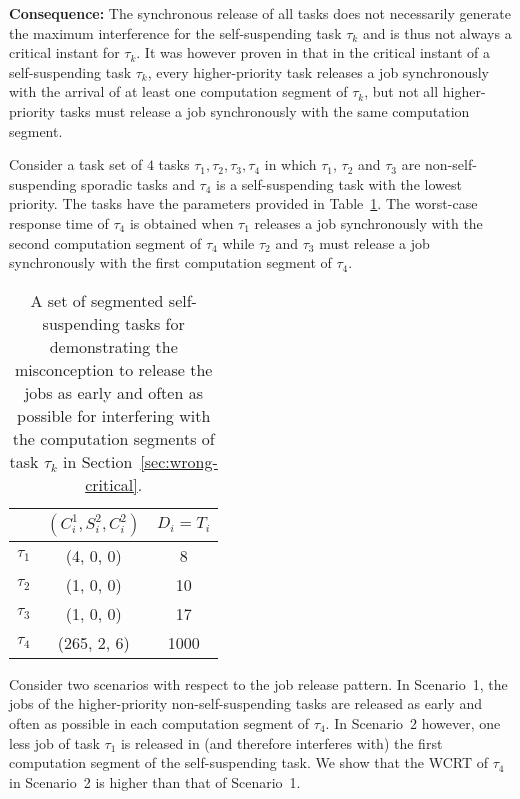 {\bf Consequence:}  The synchronous release of all tasks does not necessarily generate the maximum interference for the self-suspending task $\tau_k$ and is thus not always a critical instant for $\tau_k$. 
It was however proven in \cite{ecrts15nelissen} that in the critical instant of a self-suspending task $\tau_k$, every higher-priority task releases a job synchronously with the arrival of at least one computation segment of $\tau_k$, but not all higher-priority tasks must release a job synchronously with the same computation segment.


Consider a task set of $4$ tasks $\tau_1, \tau_2, \tau_3, \tau_4$ in which $\tau_1$, $\tau_2$ and $\tau_3$ are non-self-suspending sporadic tasks and $\tau_4$ is a self-suspending task with the lowest priority. The tasks have the parameters provided in Table~\ref{table:ex-num-releases}. The worst-case response time of $\tau_4$ is obtained when $\tau_1$ releases a job synchronously with the second computation segment of $\tau_4$ while $\tau_2$ and $\tau_3$ must release a job synchronously with the first computation segment of $\tau_4$.

\begin{table}[t]
\centering
    \begin{tabular}{|c|c|c|}
 \hline
        & $(C_i^1, S_i^2, C_i^2)$ &  $D_i=T_i$\\ 
        \hline
        $\tau_1$ & (4, 0, 0) &  8\\ 
        $\tau_2$ &  (1, 0, 0) & 10 \\ 
        $\tau_3$ & (1, 0, 0) & 17 \\
        $\tau_4$ & (265, 2, 6) & 1000\\
        \hline
    \end{tabular} 
    \caption{A set of segmented self-suspending tasks for demonstrating the misconception to release the jobs as early and often as possible for interfering with the computation segments of task $\tau_k$ in Section~\ref{sec:wrong-critical}. }
    \label{table:ex-num-releases}
\end{table}

Consider two scenarios with respect to the job release pattern. In Scenario~1, the jobs of the higher-priority non-self-suspending tasks are released as early and often as possible in each computation segment of $\tau_4$. In Scenario~2 however, one less job of task $\tau_1$ is released in (and therefore interferes with) the first computation segment of the self-suspending task. We show that the WCRT of $\tau_4$ in Scenario~2 is higher than that of Scenario~1. 


